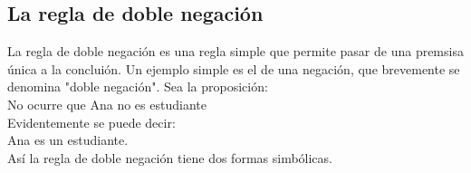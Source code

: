 \documentclass{book}
\numberwithin{equation}{section}
\theoremstyle{plain}  %
\begin{document}
\subsection{La regla de doble negación}
La regla de doble negación es una regla simple que permite pasar de una premsisa única a la concluión. Un 
ejemplo simple es el de una negación, que brevemente se denomina "doble negación". Sea la proposición: \\ 
No ocurre que Ana no es estudiante\\ 
Evidentemente se puede decir: \\ 
Ana es un estudiante. \\ 
Así la regla de doble negación tiene dos formas simbólicas. 
\end{document}
